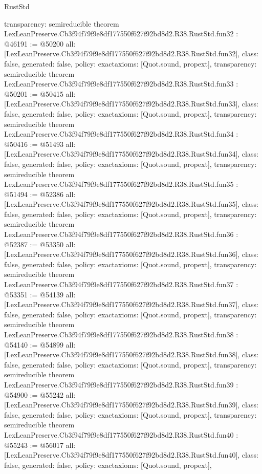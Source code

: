 \begin{lexlean}{RustStd}
\begin{coremodule}
{  transparency: semireducible
}
theorem LexLeanPreserve.Cb3f94f79f9e8df177550f627f92bd8d2.R38.RustStd.fun32 : @46191 := @50200 {
  all: [LexLeanPreserve.Cb3f94f79f9e8df177550f627f92bd8d2.R38.RustStd.fun32],
  class: false,
  generated: false,
  policy: exact{axioms: [Quot.sound, propext]},
  transparency: semireducible
}
theorem LexLeanPreserve.Cb3f94f79f9e8df177550f627f92bd8d2.R38.RustStd.fun33 : @50201 := @50415 {
  all: [LexLeanPreserve.Cb3f94f79f9e8df177550f627f92bd8d2.R38.RustStd.fun33],
  class: false,
  generated: false,
  policy: exact{axioms: [Quot.sound, propext]},
  transparency: semireducible
}
theorem LexLeanPreserve.Cb3f94f79f9e8df177550f627f92bd8d2.R38.RustStd.fun34 : @50416 := @51493 {
  all: [LexLeanPreserve.Cb3f94f79f9e8df177550f627f92bd8d2.R38.RustStd.fun34],
  class: false,
  generated: false,
  policy: exact{axioms: [Quot.sound, propext]},
  transparency: semireducible
}
theorem LexLeanPreserve.Cb3f94f79f9e8df177550f627f92bd8d2.R38.RustStd.fun35 : @51494 := @52386 {
  all: [LexLeanPreserve.Cb3f94f79f9e8df177550f627f92bd8d2.R38.RustStd.fun35],
  class: false,
  generated: false,
  policy: exact{axioms: [Quot.sound, propext]},
  transparency: semireducible
}
theorem LexLeanPreserve.Cb3f94f79f9e8df177550f627f92bd8d2.R38.RustStd.fun36 : @52387 := @53350 {
  all: [LexLeanPreserve.Cb3f94f79f9e8df177550f627f92bd8d2.R38.RustStd.fun36],
  class: false,
  generated: false,
  policy: exact{axioms: [Quot.sound, propext]},
  transparency: semireducible
}
theorem LexLeanPreserve.Cb3f94f79f9e8df177550f627f92bd8d2.R38.RustStd.fun37 : @53351 := @54139 {
  all: [LexLeanPreserve.Cb3f94f79f9e8df177550f627f92bd8d2.R38.RustStd.fun37],
  class: false,
  generated: false,
  policy: exact{axioms: [Quot.sound, propext]},
  transparency: semireducible
}
theorem LexLeanPreserve.Cb3f94f79f9e8df177550f627f92bd8d2.R38.RustStd.fun38 : @54140 := @54899 {
  all: [LexLeanPreserve.Cb3f94f79f9e8df177550f627f92bd8d2.R38.RustStd.fun38],
  class: false,
  generated: false,
  policy: exact{axioms: [Quot.sound, propext]},
  transparency: semireducible
}
theorem LexLeanPreserve.Cb3f94f79f9e8df177550f627f92bd8d2.R38.RustStd.fun39 : @54900 := @55242 {
  all: [LexLeanPreserve.Cb3f94f79f9e8df177550f627f92bd8d2.R38.RustStd.fun39],
  class: false,
  generated: false,
  policy: exact{axioms: [Quot.sound, propext]},
  transparency: semireducible
}
theorem LexLeanPreserve.Cb3f94f79f9e8df177550f627f92bd8d2.R38.RustStd.fun40 : @55243 := @56017 {
  all: [LexLeanPreserve.Cb3f94f79f9e8df177550f627f92bd8d2.R38.RustStd.fun40],
  class: false,
  generated: false,
  policy: exact{axioms: [Quot.sound, propext]},
}
\end{coremodule}
\end{lexlean}
